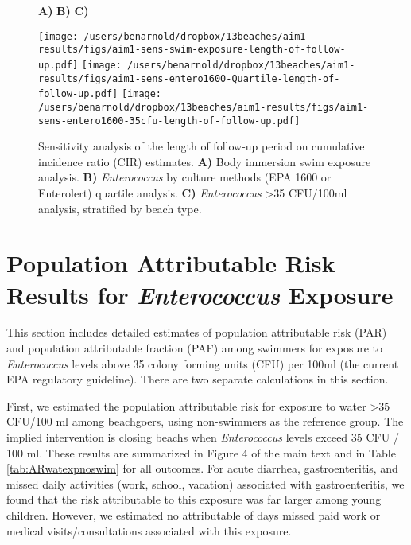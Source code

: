 \documentclass[12pt]{article}\usepackage[]{graphicx}\usepackage[]{color}
\begin{document}
\begin{landscape}
\begin{figure}[htbp]
{\large \hspace{1cm} \textbf{A)} \hspace{7cm} \textbf{B)}    \hspace{7cm} \textbf{C)} }\\

\begin{center}
 \texttt{[image: /users/benarnold/dropbox/13beaches/aim1-results/figs/aim1-sens-swim-exposure-length-of-follow-up.pdf]} 
 \texttt{[image: /users/benarnold/dropbox/13beaches/aim1-results/figs/aim1-sens-entero1600-Quartile-length-of-follow-up.pdf]} 
  \texttt{[image: /users/benarnold/dropbox/13beaches/aim1-results/figs/aim1-sens-entero1600-35cfu-length-of-follow-up.pdf]} 

\begin{minipage}{1.2\textwidth}

\caption{Sensitivity analysis of the length of follow-up period on cumulative incidence ratio (CIR) estimates. \textbf{A)} Body immersion swim exposure analysis. \textbf{B)} \textit{Enterococcus} by culture methods (EPA 1600 or Enterolert) quartile analysis. \textbf{C)} \textit{Enterococcus} >35 CFU/100ml analysis, stratified by beach type. \label{fig:fulengthsens} }
\end{minipage}
\end{center}
\end{figure}
\end{landscape}

\clearpage
\section{Population Attributable Risk Results for \textit{Enterococcus} Exposure}

This section includes detailed estimates of population attributable risk (PAR) and population attributable fraction (PAF) among swimmers for exposure to \textit{Enterococcus} levels above 35 colony forming units (CFU) per 100ml (the current EPA regulatory guideline). There are two separate calculations in this section. 

First, we estimated the population attributable risk for exposure to water >35 CFU/100 ml among beachgoers, using non-swimmers as the reference group. The implied intervention is closing beachs when \textit{Enterococcus} levels exceed 35 CFU / 100 ml.  These results are summarized in Figure 4 of the main text and in Table \ref{tab:ARwatexpnoswim} for all outcomes. For acute diarrhea, gastroenteritis, and missed daily activities (work, school, vacation) associated with gastroenteritis, we found that the risk attributable to this exposure was far larger among young children. However, we estimated no attributable of days missed paid work or medical visits/consultations associated with this exposure.
\end{document}
